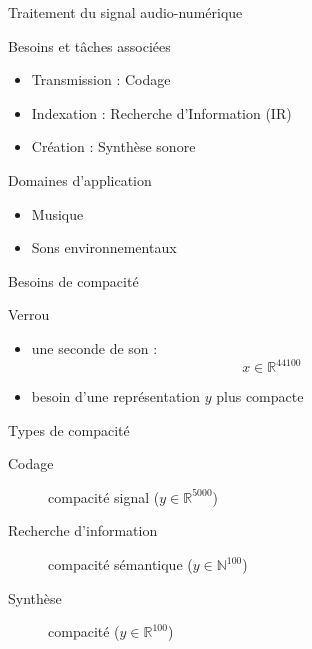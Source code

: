 \begin{frame}{Traitement du signal audio-numérique}
\begin{block}{Besoins et tâches associées}
\begin{itemize}
\item Transmission : Codage
\item Indexation : Recherche d'Information (IR)
\item Création : Synthèse sonore
\end{itemize}
\end{block}
\begin{block}{Domaines d'application}
\begin{itemize}
\item Musique
\item Sons environnementaux
\end{itemize}
\end{block}
\end{frame}


\begin{frame}{Besoins de compacité}
\begin{block}{Verrou}
\begin{itemize}
\item une seconde de son : $$ x \in \mathbb{R}^{44100}$$
\item besoin d'une représentation $y$ plus compacte
\end{itemize}
\end{block}
\begin{block}{Types de compacité}
\begin{description}
\item[\alert{Codage}] compacité signal ($ y \in \mathbb{R}^{5000}$)
\item[\alert{Recherche d'information}] compacité sémantique ($ y \in \mathbb{N}^{100}$)
\item[\alert{Synthèse}] compacité \alert{\og}  \alert{\fg} ($ y \in \mathbb{R}^{100}$)
\end{description}
\end{block}
\end{frame}